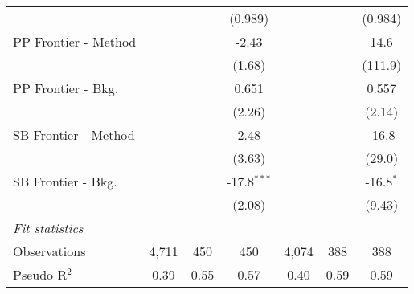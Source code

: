 \begin{tabular}{lcccccc}
                        &                &         & (0.989)       &               &              & (0.984)\\   
   PP Frontier - Method &                &         & -2.43         &               &              & 14.6\\   
                        &                &         & (1.68)        &               &              & (111.9)\\   
   PP Frontier - Bkg.   &                &         & 0.651         &               &              & 0.557\\   
                        &                &         & (2.26)        &               &              & (2.14)\\   
   SB Frontier - Method &                &         & 2.48          &               &              & -16.8\\   
                        &                &         & (3.63)        &               &              & (29.0)\\   
   SB Frontier - Bkg.   &                &         & -17.8$^{***}$ &               &              & -16.8$^{*}$\\   
                        &                &         & (2.08)        &               &              & (9.43)\\   
   \midrule
   \emph{Fit statistics}\\
   Observations         & 4,711          & 450     & 450           & 4,074         & 388          & 388\\  
   Pseudo R$^2$         & 0.39           & 0.55    & 0.57          & 0.40          & 0.59         & 0.59\\  
   

\end{tabular}
